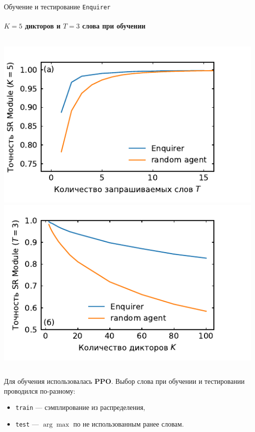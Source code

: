 \documentclass[aspectratio=169]{beamer}
\newcommand{\enquirer}{\texttt{Enquirer}}
\newcommand{\imgscale}{0.8}
\begin{document}
\begin{frame}[t]{Обучение и тестирование \enquirer{}}
    \framesubtitle{$K = 5$ дикторов  и $T = 3$ слова при обучении}
    \begin{columns}
        \centering
        \includegraphics[scale=\imgscale]{../plots/word_sweep_enq.pdf}
        \includegraphics[scale=\imgscale]{../plots/guest_sweep_enq.pdf}
    \end{columns}\vspace*{1em}
    Для обучения использовалась \textbf{PPO}. Выбор слова при обучении и
    тестировании проводился по-разному:
    \begin{itemize}
        \item \texttt{train} --- сэмплирование из распределения,
        \item \texttt{test} --- $\arg \max$ по не использованным ранее словам.
    \end{itemize}
\end{frame}
\end{document}
